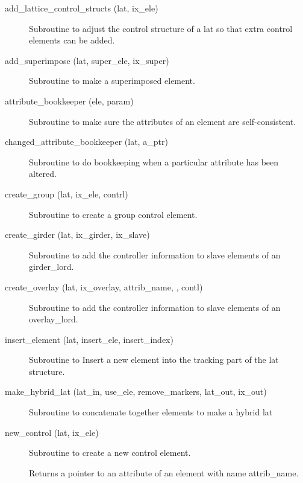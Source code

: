 \begin{description}

\item[add_lattice_control_structs (lat, ix_ele)] \Newline 
Subroutine to adjust the control structure of a lat so that extra control
elements can be added.

\item[add_superimpose (lat, super_ele, ix_super)] \Newline
Subroutine to make a superimposed element. 

\item[attribute_bookkeeper (ele, param)] \Newline
Subroutine to make sure the attributes of an element are self-consistent. 

\item[changed_attribute_bookkeeper (lat, a_ptr)] \Newline 
Subroutine to do bookkeeping when a particular attribute has been altered.

\item[create_group (lat, ix_ele, contrl)] \Newline
Subroutine to create a group control element. 

\item[create_girder (lat, ix_girder, ix_slave)] \Newline 
     Subroutine to add the controller information to slave elements of
     an girder_lord.

\item[create_overlay (lat, ix_overlay, attrib_name, , contl)] \Newline
Subroutine to add the controller information to slave elements of an 
overlay_lord. 

\item[insert_element (lat, insert_ele, insert_index)] \Newline
Subroutine to Insert a new element into the tracking part of the 
lat structure. 

\item[make_hybrid_lat (lat_in, use_ele, remove_markers, lat_out, ix_out)] \Newline
Subroutine to concatenate together elements to make a hybrid lat 

\item[new_control (lat, ix_ele)] \Newline
Subroutine to create a new control element. 

\item[\protect\parbox{6in}{pointer_to_attribute (ele, attrib_name, do_allocation, 
\\ \hspace*{2in} ptr_attrib, ix_attrib, err_flag, err_print_flag)}] \Newline
Returns a pointer to an attribute of an element with name attrib_name. 


\end{description}
